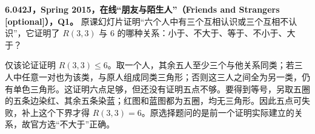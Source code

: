 \begin{exercise}\label{mit:6042-online-friends-and-strangers-q1}
\textbf{6.042J，Spring 2015，在线“朋友与陌生人”（Friends and Strangers [optional]），Q1。}
原课幻灯片证明“六个人中有三个互相认识或三个互相不认识”，它证明了 $R(3,3)$ 与 $6$ 的哪种关系：小于、不大于、等于、不小于、大于？
\end{exercise}
\begin{solution}
仅该论证证明 $R(3,3)\le6$。取一个人，其余五人至少三个与他关系同类；若三人中任意一对也为该类，与原人组成同类三角形；否则这三人之间全为另一类，仍有单色三角形。这证明六点足够，但还没有证明五点不够。要得到等号，另取五圈的五条边染红、其余五条染蓝；红图和蓝图都为五圈，均无三角形。因此五点可失败，补上这个下界才得 $R(3,3)=6$。原选择题问的是前一个证明实际建立的关系，故官方选“不大于”正确。
\end{solution}
